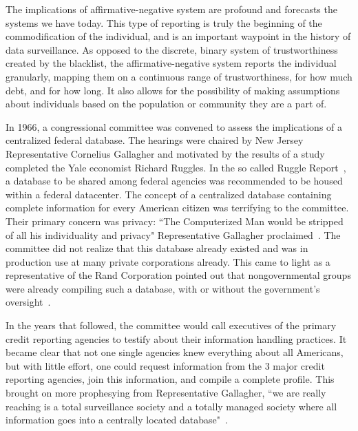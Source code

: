 The implications of affirmative-negative system are profound and forecasts
the systems we have today. This type of reporting is truly the
beginning of the commodification of the individual, and is an important
waypoint in the history of data surveillance. As opposed to the discrete,
binary system of trustworthiness created by the blacklist, the
affirmative-negative system reports the individual granularly, mapping them on
a continuous range of trustworthiness, for how much debt, and for how long. It also
allows for the possibility of making assumptions about individuals based
on the population or community they are a part of.

In 1966, a congressional committee was convened to assess the implications of a
centralized federal database. The hearings were chaired by New Jersey
Representative Cornelius Gallagher and motivated by the results of a study
completed the Yale economist Richard Ruggles. In the so called Ruggle
Report~\cite{ruggles1965report}, a database to be shared among federal agencies
was recommended to be housed within a federal datacenter. The concept of a
centralized database containing complete information for every American citizen
was terrifying to the committee. Their primary concern was privacy: ``The
Computerized Man would be stripped of all his individuality and privacy"
Representative Gallagher proclaimed~\cite{ruggles1965report}. The committee did
not realize that this database already existed and was in production use at
many private corporations already. This came to light as a representative of
the Rand Corporation pointed out that nongovernmental groups were already
compiling such a database, with or without the government's
oversight~\cite{congress1967privacy}.

In the years that followed, the committee would call executives of the primary
credit reporting agencies to testify about their information handling
practices. It became clear that not one single agencies knew everything about
all Americans, but with little effort, one could request information from the 3
major credit reporting agencies, join this information, and compile a complete
profile. This brought on more prophesying from Representative Gallagher, ``we
are really reaching is a total surveillance society and a totally managed
society where all information goes into a centrally located
database"~\cite{congress1967privacy}.


